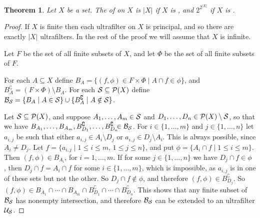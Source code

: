 \documentclass[12pt]{article}
\newtheorem*{thm*}{Theorem}
\def\powerset#1{\mathcal{P}(#1)}
\begin{document}

\begin{thm*}
Let $X$ be a set.
The  of  on $X$ is $|X|$ if $X$ is ,
and $2^{2^{|X|}}$ if $X$ is .
\end{thm*}

\begin{proof}
If $X$ is finite then each ultrafilter on $X$ is principal,
and so there are exactly $|X|$ ultrafilters.
In the rest of the proof we will assume that $X$ is infinite.

Let $F$ be the set of all finite subsets of $X$,
and let $\Phi$ be the set of all finite subsets of $F$.

For each $A\subseteq X$ define
$B_A=\{(f,\phi)\in F\times\Phi\mid A\cap f\in\phi\}$,
and $B_A^\complement=(F\times\Phi)\setminus B_A$.
For each ${\cal S}\subseteq\powerset{X}$ 
define ${\cal B}_{\cal S}=
\{B_A\mid A\in{\cal S}\}\cup\{B_A^\complement\mid A\notin{\cal S}\}$.

Let ${\cal S}\subseteq\powerset{X}$,
and suppose $A_1,\dots,A_m\in\cal S$
and $D_1,\dots,D_n\in\powerset{X}\setminus\cal S$,
so that we have
$B_{A_1},\dots,B_{A_m},B_{D_1}^\complement,\dots,
B_{D_n}^\complement\!\!\!\in{\cal B}_{\cal S}$.
For $i\in\{1,\dots,m\}$ and $j\in\{1,\dots,n\}$
let $a_{i,j}$ be such that
either $a_{i,j}\in A_i\setminus D_j$ or $a_{i,j}\in D_j\setminus A_i$.
This is always possible, since $A_i\ne D_j$.
Let $f=\{a_{i,j}\mid1\le i\le m,\,1\le j\le n\}$,
and put $\phi=\{A_i\cap f\mid1\le i\le m\}$.
Then $(f,\phi)\in B_{A_i}$, for $i=1,\dots,m$.
If for some $j\in\{1,\dots,n\}$ we have $D_j\cap f\in\phi$ ,
then $D_j\cap f=A_i\cap f$ for some $i\in\{1,\dots,m\}$,
which is impossible,
as $a_{i,j}$ is in one of these sets but not the other.
So $D_j\cap f\notin\phi$,
and therefore $(f,\phi)\in B_{D_j}^\complement$.
So $(f,\phi)\in B_{A_1}\cap\cdots\cap B_{A_m}\cap
B_{D_1}^\complement\cap\cdots\cap B_{D_n}^\complement$.
This shows that any finite subset  of ${\cal B}_{\cal S}$ 
has nonempty intersection,
and therefore ${\cal B}_{\cal S}$ 
can be extended to an ultrafilter ${\cal U}_{\cal S}$.


\end{proof}
\end{document}
